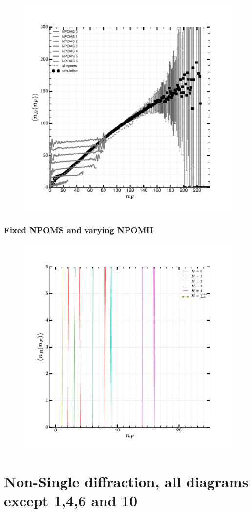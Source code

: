 \documentclass[]{article}
\begin{document}
\begin{figure}[h!]
    \centering
\includegraphics[scale=0.5]{../analyzed/nbnf_allnpoms_0npomh.pdf}
\caption{}
\end{figure}

\subsubsection*{\centering Fixed NPOMS and varying NPOMH}

\begin{figure}[h!]
    \centering
    \includegraphics[scale=0.5]{../analyzed/nbnf_fixed_s_var_h.pdf}
    \caption{}
\end{figure}

\section*{\centering Non-Single diffraction, all diagrams except 1,4,6 and 10}
\end{document}
